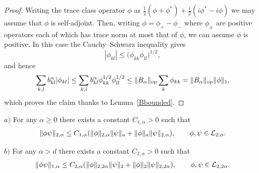 \documentclass[pdftex]{sigma}
\begin{document}
\begin{proof}
Writing the trace class operator $\phi$ as $\frac
12(\phi+\phi^*)+\frac i2(i\phi^*-i\phi)$ we may assume that $\phi$ is
self-adjoint. Then, writing $\phi= \phi_+-\phi_-$ where $\phi_\pm$ are positive
operators each of which has trace norm at most that of $\phi$, we can
assume $\phi$ is positive. In this case the Cauchy--Schwarz inequality
gives
\[
|\phi_{kl}|  \leq \big(\phi_{kk} \phi_{ll}\big)^{1/2},
\]
and hence
\begin{gather*}
\sum_{k,l}b_{kl}^{\alpha} |\phi_{kl}|\leq
\sum_{k,l}b_{kl}^{\alpha} \phi_{kk}^{1/2} \phi_{ll}^{1/2}
\leq \Vert B_{\alpha}\Vert_{\rm op} \sum_k\phi_{kk}
=\Vert B_{\alpha}\Vert_{\rm op} \Vert\phi\Vert_1 ,
\end{gather*}
which proves the claim thanks to Lemma~\ref{Bbounded}.
\end{proof}

\begin{lemma}\label{product}
$a)$  For any $\alpha\geq 0$ there exists a constant $C_{1,\alpha}>0$
such that
\begin{gather}\label{prodest1}
\Vert\phi \psi\Vert_{2,\alpha}\leq C_{1,\alpha}(\Vert\phi\Vert_{2,\alpha} \Vert\psi\Vert_a
+\Vert\phi\Vert_a \Vert\psi\Vert_{2,\alpha}),\qquad \phi, \psi\in {\cal L}_{2,\alpha} .
\end{gather}

$b)$  For any $\alpha> d$ there exists a constant $C_{2,\alpha}>0$
such that
\begin{gather}\label{prodest2}
\Vert\phi \psi\Vert_{1,\alpha}\leq C_{2,\alpha}(\Vert\phi\Vert_{2,2\alpha} \Vert\psi\Vert_2
+\Vert\phi\Vert_2 \Vert\psi\Vert_{2,2\alpha}),\qquad \phi,\psi\in {\cal L}_{2, 2\alpha} .
\end{gather}
\end{lemma}
\end{document}
